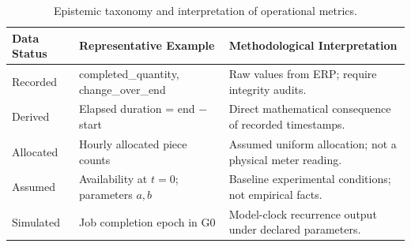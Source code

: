 \begin{table}[!htbp]
\centering
\caption{Epistemic taxonomy and interpretation of operational metrics.}
\label{tab:information_status}
\renewcommand{\arraystretch}{1.15}
\small
\begin{tabularx}{\textwidth}{>{\raggedright\arraybackslash}p{2.2cm}>{\raggedright\arraybackslash}p{4.2cm}X}
\toprule
\textbf{Data Status} & \textbf{Representative Example} & \textbf{Methodological Interpretation} \\
\midrule
Recorded & completed\_quantity, change\_over\_end & Raw values from ERP; require integrity audits. \\
Derived & Elapsed duration = end $-$ start & Direct mathematical consequence of recorded timestamps. \\
Allocated & Hourly allocated piece counts & Assumed uniform allocation; not a physical meter reading. \\
Assumed & Availability at $t=0$; parameters $a, b$ & Baseline experimental conditions; not empirical facts. \\
Simulated & Job completion epoch in G0 & Model-clock recurrence output under declared parameters. \\
\bottomrule
\end{tabularx}
\end{table}
